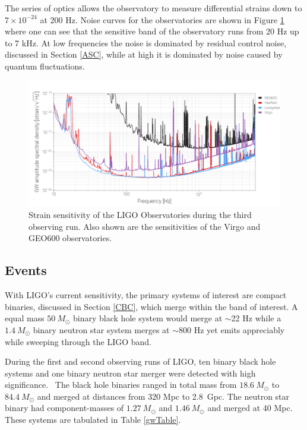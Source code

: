 \documentclass [12pt, proquest]{uwthesis}[2019]
\begin{document}
The series of optics allows the observatory to measure differential strains down to $7\times10^{-24}$ at 200 Hz.  Noise curves for the observatories are shown in Figure \ref{LIGO_Strain} where one can see that the sensitive band of the observatory runs from 20 Hz up to 7 kHz. At low frequencies the noise is dominated by residual control noise, discussed in Section \ref{ASC}, while at high it is dominated by noise caused by quantum fluctuations. ~\cite{Squeeze}

\begin{figure}[!h]
\begin{center}
\includegraphics[width=\textwidth]{LIGOSens.png}
\caption[Strain sensitivity of the LIGO and Virgo Observatories]{Strain sensitivity of the LIGO Observatories during the third observing run. Also shown are the sensitivities of the Virgo and GEO600 observatories.~\cite{LIGOopen}}
\label{LIGO_Strain}
\end{center}
\end{figure}


\subsection{Events}

With LIGO's current sensitivity, the primary systems of interest are compact binaries, discussed in Section \ref{CBC}, which merge within the band of interest. A equal mass $50\ M_\odot$ binary black hole system would merge at $\sim$22 Hz while a $1.4\ M_\odot$ binary neutron star system merges at $\sim$800 Hz yet emits appreciably while sweeping through the LIGO band.

During the first and second observing runs of LIGO, ten binary black hole systems and one binary neutron star merger were detected with high significance.~\cite{GWTC} The black hole binaries ranged in total mass from $18.6\ M_\odot$ to $84.4\ M_\odot$ and merged at distances from 320 Mpc to 2.8~Gpc. The neutron star binary had component-masses of $1.27\ M_\odot$ and $1.46\ M_\odot$ and merged at 40 Mpc. These systems are tabulated in Table \ref{gwTable}.
\end{document}
